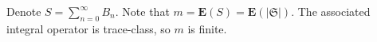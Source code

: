 \documentclass[11pt]{article}
\begin{document}
Denote $ S=\sum\limits_{n=0}^\infty B_n$. Note that $m = \mathbf E(S) = \mathbf E(|\mathfrak S |) $. The associated integral operator is trace-class, so $m$ is finite.



%     



\newpage


\end{document}

